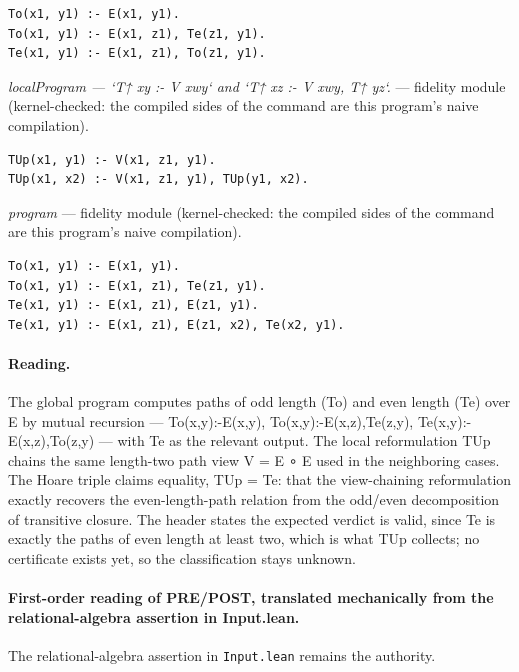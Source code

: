 \documentclass[10pt]{article}
\begin{document}
\begin{Verbatim}[fontsize=\scriptsize,breaklines=true,breakanywhere=true,frame=single,framesep=1.5mm]
To(x1, y1) :- E(x1, y1).
To(x1, y1) :- E(x1, z1), Te(z1, y1).
Te(x1, y1) :- E(x1, z1), To(z1, y1).
\end{Verbatim}

{\raggedright\textit{localProgram --- `T↑ xy :- V xwy` and `T↑ xz :- V xwy, T↑ yz`.} --- fidelity module (kernel-checked: the compiled sides of the command are this program's naive compilation).\par}

\begin{Verbatim}[fontsize=\scriptsize,breaklines=true,breakanywhere=true,frame=single,framesep=1.5mm]
TUp(x1, y1) :- V(x1, z1, y1).
TUp(x1, x2) :- V(x1, z1, y1), TUp(y1, x2).
\end{Verbatim}

{\raggedright\textit{program} --- fidelity module (kernel-checked: the compiled sides of the command are this program's naive compilation).\par}

\begin{Verbatim}[fontsize=\scriptsize,breaklines=true,breakanywhere=true,frame=single,framesep=1.5mm]
To(x1, y1) :- E(x1, y1).
To(x1, y1) :- E(x1, z1), Te(z1, y1).
Te(x1, y1) :- E(x1, z1), E(z1, y1).
Te(x1, y1) :- E(x1, z1), E(z1, x2), Te(x2, y1).
\end{Verbatim}

\paragraph{Reading.} The global program computes paths of odd length (To) and even length (Te) over E by mutual recursion --- To(x,y):-E(x,y), To(x,y):-E(x,z),Te(z,y), Te(x,y):-E(x,z),To(z,y) --- with Te as the relevant output. The local reformulation TUp chains the same length-two path view V = E ∘ E used in the neighboring cases. The Hoare triple claims equality, TUp = Te: that the view-chaining reformulation exactly recovers the even-length-path relation from the odd/even decomposition of transitive closure. The header states the expected verdict is valid, since Te is exactly the paths of even length at least two, which is what TUp collects; no certificate exists yet, so the classification stays unknown.

\paragraph{First-order reading of PRE/POST, translated mechanically from the relational-algebra assertion in Input.lean.} The relational-algebra assertion in \texttt{Input.lean} remains the authority.
\end{document}
